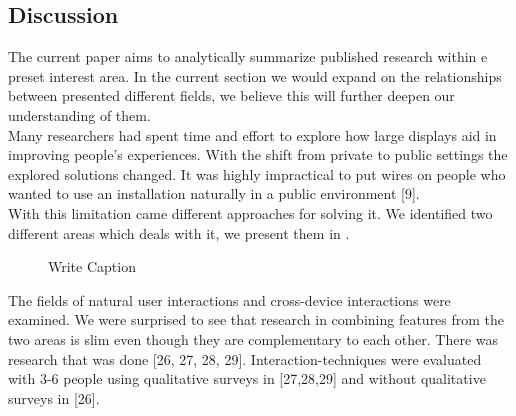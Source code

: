 \subsection{Discussion}

The current paper aims to analytically summarize published research within e preset interest area. In the current section we would expand on the relationships between presented different fields, we believe this will further deepen our understanding of them.\\
Many researchers had spent time and effort to explore how large displays aid in improving people's experiences. 
With the shift from private to public settings the explored solutions changed. 
It was highly impractical to put wires on people who wanted to use an installation naturally in a public environment [9].\\

With this limitation came different approaches for solving it. 
We identified two different areas which deals with it, we present them in .

\begin{figure}[h!]
\centering
{}
\caption{Write Caption}
\label{fig:litreview}
\end{figure}

The fields of natural user interactions and cross-device interactions were examined. 
We were surprised to see that research in combining features from the two areas is slim even though they are complementary to each other. 
There was research that was done [26, 27, 28, 29]. 
Interaction-techniques were evaluated with 3-6 people using qualitative surveys in [27,28,29] and without qualitative surveys in [26].\\

